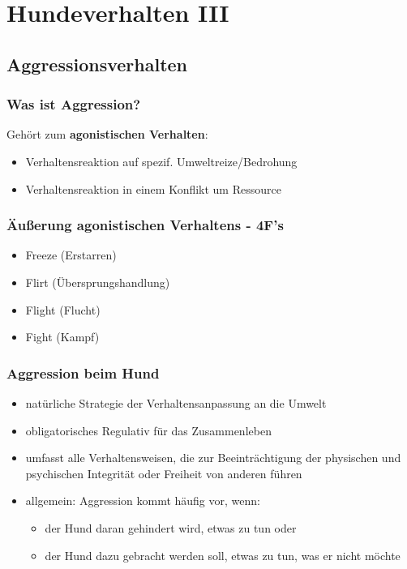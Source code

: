 \chapter{Hundeverhalten III}


\section{Aggressionsverhalten}
    \subsection{Was ist Aggression?}
    Gehört zum \textbf{agonistischen Verhalten}:
    \begin{itemize}
        \item Verhaltensreaktion auf spezif. Umweltreize/Bedrohung
        \item Verhaltensreaktion in einem Konflikt um Ressource
    \end{itemize}

    \subsection{Äußerung agonistischen Verhaltens - 4F's}
    \begin{itemize}
        \item Freeze (Erstarren)
        \item Flirt (Übersprungshandlung)
        \item Flight (Flucht)
        \item Fight (Kampf)
    \end{itemize}

    \subsection{Aggression beim Hund}
    \begin{itemize}
        \item natürliche Strategie der Verhaltensanpassung an die Umwelt
        \item obligatorisches Regulativ für das Zusammenleben
        \item umfasst alle Verhaltensweisen, die zur Beeinträchtigung der physischen und psychischen Integrität oder Freiheit von anderen führen
        \item allgemein: Aggression kommt häufig vor, wenn:
        \begin{itemize}
            \item der Hund daran gehindert wird, etwas zu tun oder
            \item der Hund dazu gebracht werden soll, etwas zu tun, was er nicht möchte
        \end{itemize}
    \end{itemize}

